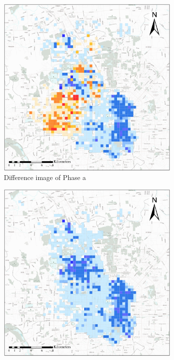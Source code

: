 \documentclass[preprints,ijgi,submit,moreauthors]{Definitions/mdpi}
\begin{document}
\begin{figure}[ht]
    \vspace{6pt}
    \begin{subfigure}{.28\textwidth}
        \includegraphics[width=\textwidth]{Figures/BSSMinusmp1.eps}
        \caption{Difference image of Phase a}\label{fig:p_a_dif}
    \end{subfigure}
        \begin{subfigure}{.28\textwidth}
        \includegraphics[width=\textwidth]{Figures/BSSMinusmp2.eps}

\end{subfigure}
\end{figure}
\end{document}
